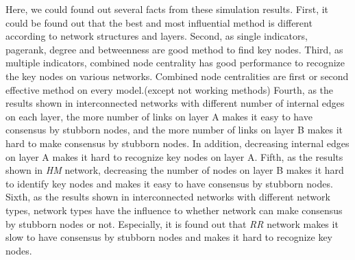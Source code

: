 Here, we could found out several facts from these simulation results. First, it could be found out that the best and most influential method is different according to network structures and layers. Second, as single indicators, pagerank, degree and betweenness are good method to find key nodes. Third, as multiple indicators, combined node centrality has good performance to recognize the key nodes on various networks. Combined node centralities are first or second effective method on every model.(except not working methods)  Fourth, as the results shown in interconnected networks with different number of internal edges on each layer, the more number of links on layer A makes it easy to have consensus by stubborn nodes, and the more number of links on layer B makes it hard to make consensus by stubborn nodes. In addition, decreasing internal edges on layer A makes it hard to recognize key nodes on layer A.  Fifth, as the results shown in \textit{HM} network, decreasing the number of nodes on layer B makes it hard to identify key nodes and makes it easy to have consensus by stubborn nodes. Sixth, as the results shown in interconnected networks with different network types, network types have the influence to whether network can make consensus by stubborn nodes or not. Especially, it is found out that \textit{RR} network makes it slow to have consensus by stubborn nodes and makes it hard to recognize key nodes. 




